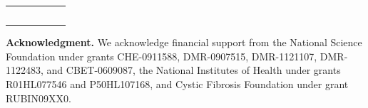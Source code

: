 \documentclass[8.5pt,twoside,twocolumn]{article}
\begin{document}
\begin{tabular}{cccccc}
&  &  &  &  &  \\ 
&  &  &  &  &  \\ 
&  &  &  &  &  \\ 
&  &  &  &  &  \\ 
&  &  &  &  & 
\end{tabular}

\textbf{Acknowledgment.} We acknowledge financial support from the National
Science Foundation under grants CHE-0911588, DMR-0907515, DMR-1121107,
DMR-1122483, and CBET-0609087, the National Institutes of Health under
grants R01HL077546 and P50HL107168, and Cystic Fibrosis Foundation under
grant RUBIN09XX0.





{\footnotesize {\ 


} }

\end{document}
